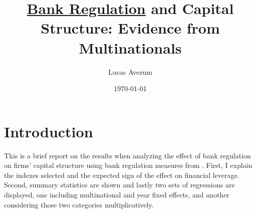\documentclass[12pt]{article}
\begin{document}
	
		\title{\underline{Bank Regulation} and Capital Structure: Evidence from Multinationals}
		\author{Lucas Avezum}
		\date{\today}
		\maketitle
			
	
	
	
	
	\doublespacing
	
\normalem

	 
	\section{Introduction} \label{sec:intro}
	
This is a brief report on the results when analyzing the effect of bank regulation on firms' capital structure using bank regulation measures from \cite*{barth2013bank}. First, I explain the indexes selected and the expected sign of the effect on financial leverage. Second, summary statistics are shown and lastly two sets of regressions are displayed, one including multinational and year fixed effects, and another considering those two categories multiplicatively. 
\end{document}
